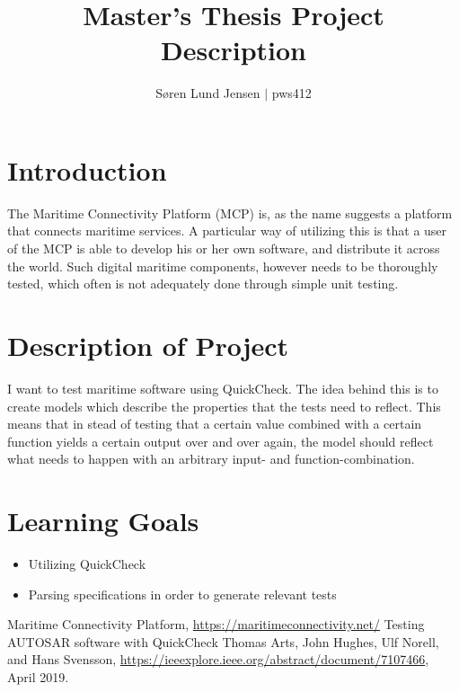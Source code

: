 \documentclass[a4paper]{article}
\title{Master's Thesis Project Description}
\author{Søren Lund Jensen $|$ pws412}
\begin{document}
\maketitle
\section*{Introduction}
The Maritime Connectivity Platform \cite{mcp} (MCP) is, as the name suggests a platform that connects maritime services. A particular way of utilizing this is that a user of the MCP is able to develop his or her own software, and distribute it across the world. Such digital maritime components, however needs to be thoroughly tested, which often is not adequately done through simple unit testing.
\section*{Description of Project}
I want to test maritime software using QuickCheck. The idea behind this is to create models which describe the properties that the tests need to reflect. This means that in stead of testing that a certain value combined with a certain function yields a certain output over and over again, the model should reflect what needs to happen with an arbitrary input- and function-combination. 
\section*{Learning Goals}
\begin{itemize}
	\item Utilizing QuickCheck
	\item Parsing specifications in order to generate relevant tests
\end{itemize}

\begin{thebibliography}{2}
		Maritime Connectivity Platform,
		\url{https://maritimeconnectivity.net/}
		Testing AUTOSAR software with QuickCheck
		Thomas Arts, John Hughes, Ulf Norell, and Hans Svensson,
		\url{https://ieeexplore.ieee.org/abstract/document/7107466},
		April 2019.
\end{thebibliography}
\end{document}

